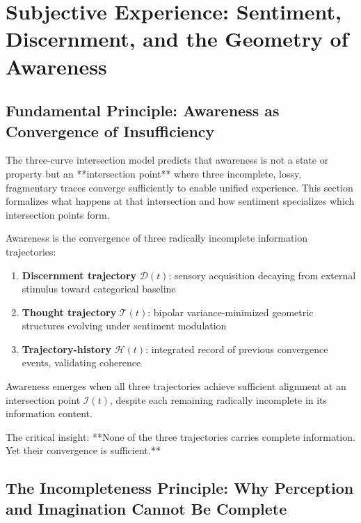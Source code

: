 \section{Subjective Experience: Sentiment, Discernment, and the Geometry of Awareness}
\label{sec:subjective-experience}

\subsection{Fundamental Principle: Awareness as Convergence of Insufficiency}

The three-curve intersection model predicts that awareness is not a state or property but an **intersection point** where three incomplete, lossy, fragmentary traces converge sufficiently to enable unified experience. This section formalizes what happens at that intersection and how sentiment specializes which intersection points form.

\begin{principle}
\label{prin:awareness-convergence}
Awareness is the convergence of three radically incomplete information trajectories:
\begin{enumerate}[label=(\roman*),leftmargin=*]
\item \textbf{Discernment trajectory} $\mathcal{D}(t)$: sensory acquisition decaying from external stimulus toward categorical baseline
\item \textbf{Thought trajectory} $\mathcal{T}(t)$: bipolar variance-minimized geometric structures evolving under sentiment modulation
\item \textbf{Trajectory-history} $\mathcal{H}(t)$: integrated record of previous convergence events, validating coherence
\end{enumerate}

Awareness emerges when all three trajectories achieve sufficient alignment at an intersection point $\mathcal{I}(t)$, despite each remaining radically incomplete in its information content.
\end{principle}

The critical insight: **None of the three trajectories carries complete information. Yet their convergence is sufficient.**

\subsection{The Incompleteness Principle: Why Perception and Imagination Cannot Be Complete}

